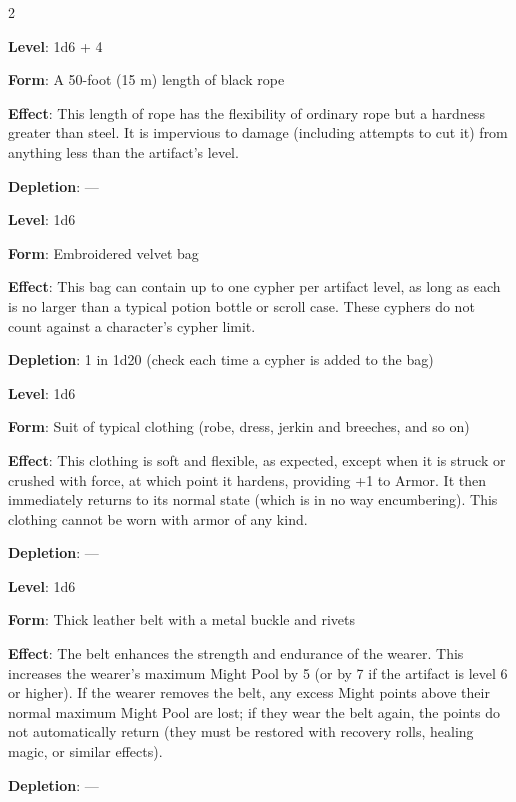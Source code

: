 \begin{multicols}{2}


\textbf{Level}: 1d6 + 4

\textbf{Form}: A 50-foot (15 m) length of black rope

\textbf{Effect}: This length of rope has the flexibility of ordinary rope but a hardness greater than steel. It is impervious to damage (including attempts to cut it) from anything less than the artifact’s level.

\textbf{Depletion}: —


\textbf{Level}: 1d6

\textbf{Form}: Embroidered velvet bag

\textbf{Effect}: This bag can contain up to one cypher per artifact level, as long as each is no larger than a typical potion bottle or scroll case. These cyphers do not count against a character’s cypher limit.

\textbf{Depletion}: 1 in 1d20 (check each time a cypher is added to the bag)


\textbf{Level}: 1d6

\textbf{Form}: Suit of typical clothing (robe, dress, jerkin and breeches, and so on)

\textbf{Effect}: This clothing is soft and flexible, as expected, except when it is struck or crushed with force, at which point it hardens, providing +1 to Armor. It then immediately returns to its normal state (which is in no way encumbering). This clothing cannot be worn with armor of any kind.

\textbf{Depletion}: —


\textbf{Level}: 1d6

\textbf{Form}: Thick leather belt with a metal buckle and rivets

\textbf{Effect}: The belt enhances the strength and endurance of the wearer. This increases the wearer’s maximum Might Pool by 5 (or by 7 if the artifact is level 6 or higher). If the wearer removes the belt, any excess Might points above their normal maximum Might Pool are lost; if they wear the belt again, the points do not automatically return (they must be restored with recovery rolls, healing magic, or similar effects).

\textbf{Depletion}: —


\end{multicols}
